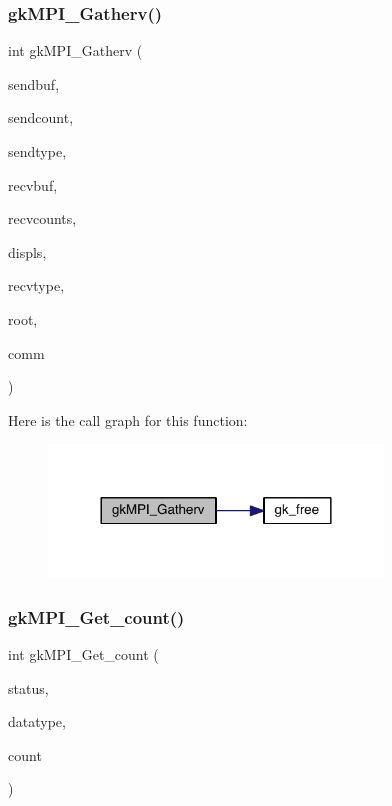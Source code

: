 \subsubsection{\texorpdfstring{gk\+M\+P\+I\+\_\+\+Gatherv()}{gkMPI\_Gatherv()}}
{\footnotesize\ttfamily int gk\+M\+P\+I\+\_\+\+Gatherv (\begin{DoxyParamCaption}\item[{void $\ast$}]{sendbuf,  }\item[{\hyperlink{a00876_aaa5262be3e700770163401acb0150f52}{idx\+\_\+t}}]{sendcount,  }\item[{M\+P\+I\+\_\+\+Datatype}]{sendtype,  }\item[{void $\ast$}]{recvbuf,  }\item[{\hyperlink{a00876_aaa5262be3e700770163401acb0150f52}{idx\+\_\+t} $\ast$}]{recvcounts,  }\item[{\hyperlink{a00876_aaa5262be3e700770163401acb0150f52}{idx\+\_\+t} $\ast$}]{displs,  }\item[{M\+P\+I\+\_\+\+Datatype}]{recvtype,  }\item[{\hyperlink{a00876_aaa5262be3e700770163401acb0150f52}{idx\+\_\+t}}]{root,  }\item[{M\+P\+I\+\_\+\+Comm}]{comm }\end{DoxyParamCaption})}

Here is the call graph for this function\+:\nopagebreak
\begin{figure}[H]
\begin{center}
\leavevmode
\includegraphics[width=252pt]{a00951_aa4c7199c90d4ab917c48ffd7c10a30b4_cgraph}
\end{center}
\end{figure}
\mbox{\label{a00951_a3f4ae6f17f49b22ef461eb0a96853302}} 
\subsubsection{\texorpdfstring{gk\+M\+P\+I\+\_\+\+Get\+\_\+count()}{gkMPI\_Get\_count()}}
{\footnotesize\ttfamily int gk\+M\+P\+I\+\_\+\+Get\+\_\+count (\begin{DoxyParamCaption}\item[{M\+P\+I\+\_\+\+Status $\ast$}]{status,  }\item[{M\+P\+I\+\_\+\+Datatype}]{datatype,  }\item[{\hyperlink{a00876_aaa5262be3e700770163401acb0150f52}{idx\+\_\+t} $\ast$}]{count }\end{DoxyParamCaption})}


